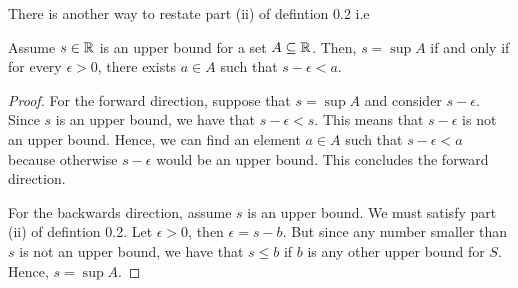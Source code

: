 There is another way to restate part (ii) of defintion 0.2 i.e 

\begin{lemma}Assume \( s \in \mathbb{R} \) is an upper bound for a set \( A \subseteq \mathbb{R} \). Then, \( s = \sup A \) if and only if for every \( \epsilon > 0 \), there exists \( a \in A \) such that \( s - \epsilon < a \).
\end{lemma}

\begin{proof}
For the forward direction, suppose that \( s = \sup A \) and consider \( s - \epsilon \). Since \( s \) is an upper bound, we have that \( s -\epsilon < s \). This means that \( s - \epsilon \) is not an upper bound. Hence, we can find an element \( a \in A \) such that \( s - \epsilon < a \) because otherwise \( s - \epsilon \) would be an upper bound. This concludes the forward direction.

For the backwards direction, assume \( s \) is an upper bound. We must satisfy part (ii) of defintion 0.2. Let \( \epsilon > 0 \), then \( \epsilon = s - b \). But since any number smaller than \( s \) is not an upper bound, we have that \( s \leq b \) if \( b \) is any other upper bound for \( S \).
Hence, \( s = \sup A \). 
\end{proof}




